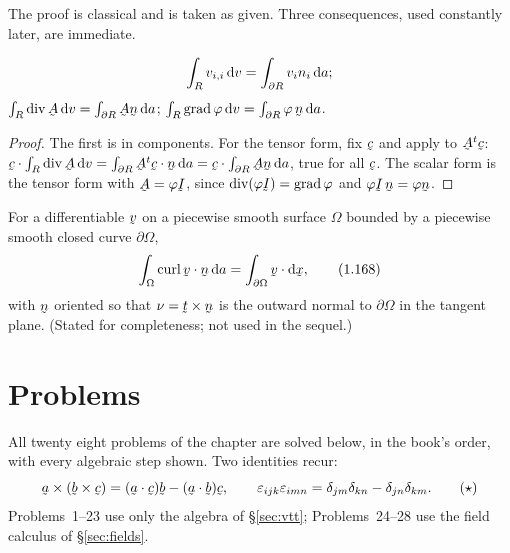 The proof is classical and is taken as given. Three consequences, used
constantly later, are immediate.

\begin{corollary}\label{cor:divforms}
\[\int_R v_{i,i}\,\mathrm{d} v=\int_{\partial R}v_in_i\,\mathrm{d} a;\]
$\int_R\dvg\bA\,\dl v=\int_{\partial R}\bA\bn\,\dl a$;
$\int_R\grad\varphi\,\dl v=\int_{\partial R}\varphi\,\bn\,\dl a$.
\end{corollary}

\begin{proof}
The first is  in components. For the tensor form, fix $\bc$ and
apply  to $\bA^{t}\bc$:
$\ip\bc{\int_R\dvg\bA\,\dl v}=\int_{\partial R}\ip{\bA^{t}\bc}\bn\,\dl a
=\ip\bc{\int_{\partial R}\bA\bn\,\dl a}$, true for all $\bc$. The scalar
form is the tensor form with $\bA=\varphi\I$, since
$\dvg(\varphi\I)=\grad\varphi$ and $\varphi\I\,\bn=\varphi\bn$.
\end{proof}

\begin{theorem}\label{thm:stokes}
For a differentiable $\bv$ on a piecewise smooth surface $\Omega$ bounded
by a piecewise smooth closed curve $\partial\Omega$,
\begin{equation}
\int_{\Omega}\ip{\crl\bv}\bn\,\dl a=\int_{\partial\Omega}\ip\bv{\dl\bx},
\tag{1.168}\label{eq:1.168}
\end{equation}
with $\bn$ oriented so that $\nu=\btt\times\bn$ is the outward normal to
$\partial\Omega$ in the tangent plane. \textup{(Stated for completeness;
not used in the sequel.)}
\end{theorem}

\setcounter{problemenv}{0}
\section{Problems}\label{sec:problems:c1}

All twenty eight problems of the chapter are solved below, in the book's
order, with every algebraic step shown. Two identities recur:
\begin{equation}
\ba\times(\bb\times\bc)=(\ip\ba\bc)\bb-(\ip\ba\bb)\bc,\qquad
\eps_{ijk}\eps_{imn}=\dd_{jm}\dd_{kn}-\dd_{jn}\dd_{km}. \tag{$\star$}
\end{equation}
Problems~1--23 use only the algebra of \S\ref{sec:vtt}; Problems~24--28 use
the field calculus of \S\ref{sec:fields}.

